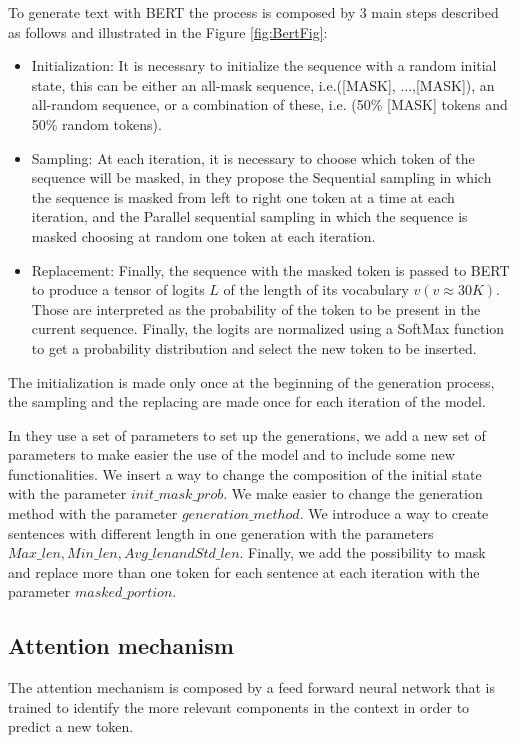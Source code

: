 \documentclass[10pt,twocolumn,letterpaper]{article}
\begin{document}
To generate text with BERT the process is composed by 3 main steps described as follows and illustrated in the Figure \ref{fig:BertFig}:

\begin{itemize}
\item Initialization: It is necessary to initialize the sequence with a random initial state, this can be either an all-mask sequence,
i.e.([MASK], ...,[MASK]), an all-random sequence, or a combination of these, i.e. (50\% [MASK] tokens and 50\% random tokens).
\item Sampling: At each iteration, it is necessary to choose which token of the sequence will be masked, in \cite{wang2019bert}
they propose the Sequential sampling in which the sequence is masked from left to right one token at a time at each iteration,
and the Parallel sequential sampling in which the sequence is masked choosing at random one token at each iteration.
\item Replacement: Finally, the sequence with the masked token is passed to BERT to produce a tensor of logits $L$ of
the length of its vocabulary $v (v \approx 30K)$. Those are interpreted as the probability of the token to be present in the current sequence.
Finally, the logits are normalized using a SoftMax function to get a probability distribution and select the new token to be inserted.
\end{itemize}

The initialization is made only once at the beginning of the generation process, the sampling and the replacing are
made once for each iteration of the model.

In \cite{wang2019bert} they use a set of parameters to set up the generations,
we add a new set of parameters to make easier the use of the model and
to include some new functionalities. We insert a way to
change the composition of the initial state with the parameter $init\_mask\_prob$.
We make easier to change the generation method with the parameter $generation\_method$.
We introduce a way to create sentences with different length in one generation with the parameters $Max\_len,
Min\_len, Avg\_len and Std\_len$. Finally, we add the possibility to mask and replace more
than one token for each sentence at each iteration with the parameter $masked\_portion$.

\subsection{Attention mechanism}
The attention mechanism is composed by a feed forward neural network that is trained to
identify the more relevant components in the context in order to predict a new token.
\end{document}
